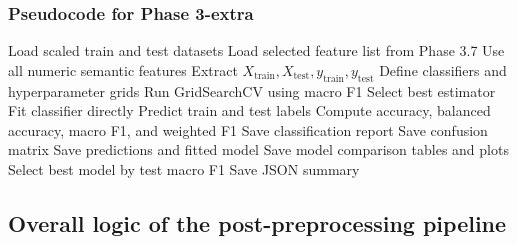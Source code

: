 \documentclass{ipgpmaster}
\begin{document}
\subsubsection{Pseudocode for Phase 3-extra}

\begin{algorithm}[H]
\caption{Phase 3-extra: Alternative classifiers}
\begin{algorithmic}[1]
\State Load scaled train and test datasets
\State Load selected feature list from Phase 3.7
    \State Use all numeric semantic features
\EndIf
\State Extract \(X_{\text{train}}, X_{\text{test}}, y_{\text{train}}, y_{\text{test}}\)
\State Define classifiers and hyperparameter grids
        \State Run GridSearchCV using macro F1
        \State Select best estimator
    \Else
        \State Fit classifier directly
    \EndIf
    \State Predict train and test labels
    \State Compute accuracy, balanced accuracy, macro F1, and weighted F1
    \State Save classification report
    \State Save confusion matrix
    \State Save predictions and fitted model
\EndFor
\State Save model comparison tables and plots
\State Select best model by test macro F1
\State Save JSON summary
\end{algorithmic}
\end{algorithm}

\subsection{Overall logic of the post-preprocessing pipeline}
\end{document}

